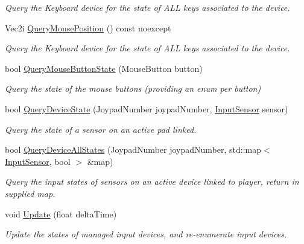 \begin{DoxyCompactItemize}
\begin{DoxyCompactList}\small\item\em Query the Keyboard device for the state of A\+LL keys associated to the device. \end{DoxyCompactList}\item 
Vec2i \hyperlink{class_blade_1_1_input_manager_a0bd64dfa38174d3fa87c445ee261d8c3}{Query\+Mouse\+Position} () const noexcept
\begin{DoxyCompactList}\small\item\em Query the Keyboard device for the state of A\+LL keys associated to the device. \end{DoxyCompactList}\item 
bool \hyperlink{class_blade_1_1_input_manager_ad2537487a4c3c80e7eb6b8c0ea37b09b}{Query\+Mouse\+Button\+State} (Mouse\+Button button)
\begin{DoxyCompactList}\small\item\em Query the state of the mouse buttons (providing an enum per button) \end{DoxyCompactList}\item 
bool \hyperlink{class_blade_1_1_input_manager_aeeafae24c87fd12586942eba26956807}{Query\+Device\+State} (Joypad\+Number joypad\+Number, \hyperlink{namespace_blade_a1ecca198b7e0afbe43139ec2b0db937c}{Input\+Sensor} sensor)
\begin{DoxyCompactList}\small\item\em Query the state of a sensor on an active pad linked. \end{DoxyCompactList}\item 
bool \hyperlink{class_blade_1_1_input_manager_ac07153a9c34d35a445ede6c89aa6cbf3}{Query\+Device\+All\+States} (Joypad\+Number joypad\+Number, std\+::map$<$ \hyperlink{namespace_blade_a1ecca198b7e0afbe43139ec2b0db937c}{Input\+Sensor}, bool $>$ \&map)
\begin{DoxyCompactList}\small\item\em Query the input states of sensors on an active device linked to player, return in supplied map. \end{DoxyCompactList}\item 
void \hyperlink{class_blade_1_1_input_manager_a1184a42c2c6b0f96d4169936090f9480}{Update} (float delta\+Time)
\begin{DoxyCompactList}\small\item\em Update the states of managed input devices, and re-\/enumerate input devices. \end{DoxyCompactList}\item 

\end{DoxyCompactItemize}
